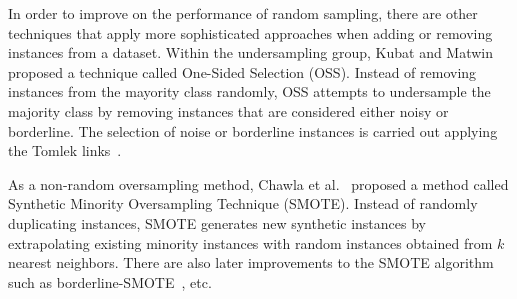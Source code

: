 \documentclass{elsart}
\begin{document}
In order to improve on the performance of random sampling, there are other techniques that apply more sophisticated approaches when adding or removing instances from a dataset. Within the undersampling group, Kubat and Matwin~\cite{kubatMatwin97} proposed
a technique called One-Sided Selection (OSS). Instead of removing instances from the mayority class randomly, OSS attempts to undersample the majority class by removing instances that are considered either noisy or borderline. The selection of noise or borderline instances is carried out applying the Tomlek links~\cite{Tomek:1976}. 


As a non-random oversampling method, Chawla et al.~\cite{ChawlaEtAl:2002} proposed a method called Synthetic Minority Oversampling Technique (SMOTE). Instead of randomly duplicating instances, SMOTE generates new synthetic instances by extrapolating existing minority instances with random instances obtained from $k$ nearest neighbors.
There are also later improvements to the SMOTE algorithm such as borderline-SMOTE~\cite{HanEtAl:2005}, etc.

\end{document}
